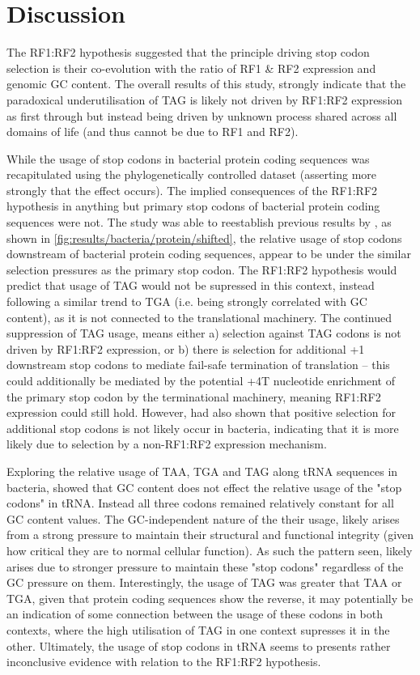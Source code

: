 \documentclass[../main.tex]{subfile}
\begin{document}
 \section{Discussion}
    The RF1:RF2 hypothesis suggested that the principle driving stop codon selection is their co-evolution with the  ratio of RF1 \& RF2 expression and genomic GC content. The overall results of this study, strongly indicate that the paradoxical underutilisation of TAG is likely not driven by RF1:RF2 expression as first through but instead being driven by unknown process shared across all domains of life (and thus cannot be due to RF1 and RF2).

    While the usage of stop codons in bacterial protein coding sequences was recapitulated using the phylogenetically controlled dataset (asserting more strongly that the effect occurs). The implied consequences of the RF1:RF2 hypothesis in anything but primary stop codons of bacterial protein coding sequences were not.
    The study was able to reestablish previous results by \textcite{Ho2019}, as shown in \cref{fig:results/bacteria/protein/shifted}, the relative usage of stop codons downstream of bacterial protein coding sequences, appear to be under the similar selection pressures as the primary stop codon. The RF1:RF2 hypothesis would predict that usage of TAG would not be supressed in this context, instead following a similar trend to TGA (i.e. being strongly correlated with GC content), as it is not connected to the translational machinery.
    The continued suppression of TAG usage, means either a) selection against TAG codons is not driven by RF1:RF2 expression, or b) there is selection for additional +1 downstream stop codons to mediate fail-safe termination of translation -- this could additionally be mediated by the potential +4T nucleotide enrichment of the primary stop codon \autocite{Ho2019} by the terminational machinery, meaning RF1:RF2 expression could still hold. However, \textcite{Ho2019} had also shown that positive selection for additional stop codons is not likely occur in bacteria, indicating that it is more likely due to selection by a non-RF1:RF2 expression mechanism.

    Exploring the relative usage of TAA, TGA and TAG along tRNA sequences in bacteria, showed that GC content does not effect the relative usage of the "stop codons" in tRNA. Instead all three codons remained relatively constant for all GC content values. The GC-independent nature of the their usage, likely arises from a strong pressure to maintain their structural and functional integrity (given how critical they are to normal cellular function). As such the pattern seen, likely arises due to stronger pressure to maintain these "stop codons" regardless of the GC pressure on them. Interestingly, the usage of TAG was greater that TAA or TGA, given that protein coding sequences show the reverse, it may potentially be an indication of some connection between the usage of these codons in both contexts, where the high utilisation of TAG in one context supresses it in the other. Ultimately, the usage of stop codons in tRNA seems to presents rather inconclusive evidence with relation to the RF1:RF2 hypothesis.
\end{document}
